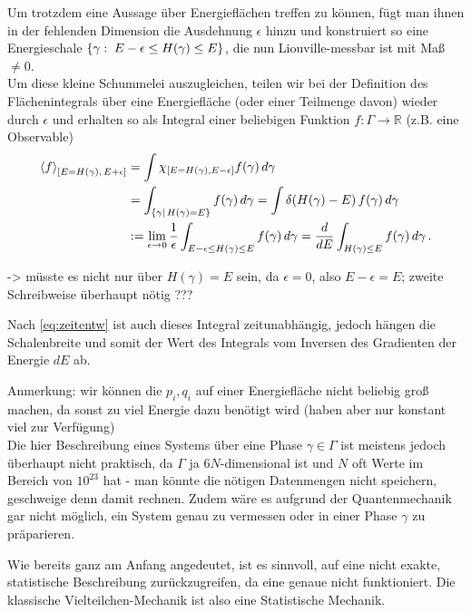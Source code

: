 \documentclass[../KlassMech_main.tex]{subfiles}
\begin{document}
Um trotzdem eine Aussage über Energieflächen treffen zu können, fügt man ihnen in der fehlenden Dimension die Ausdehnung $\epsilon$ hinzu und konstruiert so eine Energieschale $\qty{\gamma: \; E-\epsilon \leq H(\gamma) \leq E}$, die nun Liouville-messbar ist mit Maß $\neq 0$.\\
Um diese kleine Schummelei auszugleichen, teilen wir bei der Definition des Flächenintegrals über eine Energiefläche (oder einer Teilmenge davon) wieder durch $\epsilon$ und erhalten so als Integral einer beliebigen Funktion $f: \Gamma \rightarrow \mathbb{R}$ (z.B. eine Observable) 
\begin{align}\label{eq:energy}
\expval{f}_{\qty[E = H(\gamma), \, E + \epsilon]} &= \int \chi_{\qty[E = H(\gamma), E - \epsilon]} f(\gamma) \, d\gamma
\notag\\
&= \int_{\qty{\gamma | \, H(\gamma) = E}} f(\gamma) \, d\gamma = \int \delta(H(\gamma) - E) \, f(\gamma) \, d\gamma
\notag\\
&:= \lim_{\epsilon \rightarrow 0} \frac{1}{\epsilon} \int_{E-\epsilon \leq H(\gamma) \leq E} f(\gamma) \, d\gamma = \dv{E} \int_{H(\gamma) \leq E} f(\gamma) \, d\gamma \, .
\end{align}

-> müsste es nicht nur über $H(\gamma) = E$ sein, da $\epsilon = 0$, also $E - \epsilon = E$; zweite Schreibweise überhaupt nötig ???


Nach \eqref{eq:zeitentw} ist auch dieses Integral zeitunabhängig, jedoch hängen die Schalenbreite und somit der Wert des Integrals vom Inversen des Gradienten der Energie $dE$ ab.

Anmerkung: wir können die $p_i, q_i$ auf einer Energiefläche nicht beliebig groß machen, da sonst zu viel Energie dazu benötigt wird (haben aber nur konstant viel zur Verfügung)\\

Die hier Beschreibung eines Systems über eine Phase $\gamma \in \Gamma$ ist meistens jedoch überhaupt nicht praktisch, da $\Gamma$ ja $6N$-dimensional ist und $N$ oft Werte im Bereich von $10^{23}$ hat - man könnte die nötigen Datenmengen nicht speichern, geschweige denn damit rechnen. Zudem wäre es aufgrund der Quantenmechanik gar nicht möglich, ein System genau zu vermessen oder in einer Phase $\gamma$ zu präparieren.

Wie bereits ganz am Anfang angedeutet, ist es sinnvoll, auf eine nicht exakte, statistische Beschreibung zurückzugreifen, da eine genaue nicht funktioniert. Die klassische Vielteilchen-Mechanik ist also eine Statistische Mechanik.
\end{document}
